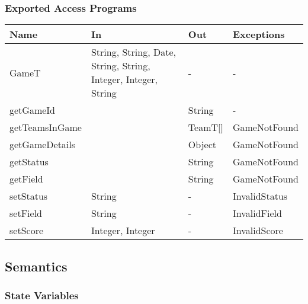 \documentclass[12pt, titlepage]{article}
\begin{document}
\begin{itemize}
\subsubsection{Exported Access Programs}
\begin{center}
  \begin{tabular}{|p{4cm}| p{4cm}| p{4cm} | p{3cm}|}
    \hline
    \textbf{Name}  & \textbf{In}                                                    & \textbf{Out} & \textbf{Exceptions} \\
    \hline
    GameT          & String, String, Date, String, String, Integer, Integer, String & -            & -                   \\
    getGameId      &                                                                & String       & -                   \\
    getTeamsInGame &                                                                & TeamT[]      & GameNotFound        \\
    getGameDetails &                                                                & Object       & GameNotFound        \\
    getStatus      &                                                                & String       & GameNotFound        \\
    getField       &                                                                & String       & GameNotFound        \\
    setStatus      & String                                                         & -            & InvalidStatus       \\
    setField       & String                                                         & -            & InvalidField        \\
    setScore       & Integer, Integer                                               & -            & InvalidScore        \\
    \hline
  \end{tabular}
\end{center}

\subsection{Semantics}

\subsubsection{State Variables}


\end{itemize}
\end{document}
